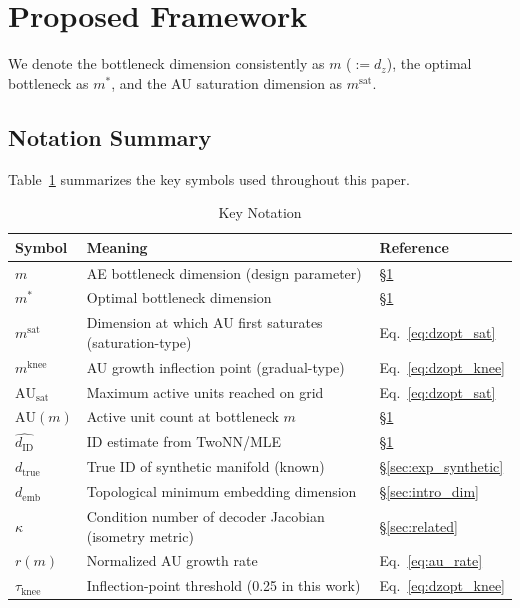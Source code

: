 \documentclass[lettersize,journal]{IEEEtran}
\newcommand{\dID}{d_{\mathrm{ID}}}
\newcommand{\dtrue}{d_{\mathrm{true}}}
\newcommand{\kap}{\kappa}
\newcommand{\AUsat}{\mathrm{AU}_{\mathrm{sat}}}
\newcommand{\demb}{d_{\mathrm{emb}}}
\begin{document}
\section{Proposed Framework}\label{sec:framework}

We denote the bottleneck dimension consistently as $m$ ($:= d_z$), the optimal bottleneck as $m^*$, and the AU saturation dimension as $m^\mathrm{sat}$.

\subsection{Notation Summary}

Table~\ref{tab:notation} summarizes the key symbols used throughout this paper.

\begin{table}[!t]
\centering
\caption{Key Notation}
\label{tab:notation}
\small
\begin{tabular}{l p{8cm} l}
\toprule
Symbol & Meaning & Reference \\
\midrule
$m$ & AE bottleneck dimension (design parameter) & \S\ref{sec:framework} \\
$m^*$ & Optimal bottleneck dimension & \S\ref{sec:framework} \\
$m^\mathrm{sat}$ & Dimension at which AU first saturates (saturation-type) & Eq.~\eqref{eq:dzopt_sat} \\
$m^\mathrm{knee}$ & AU growth inflection point (gradual-type) & Eq.~\eqref{eq:dzopt_knee} \\
$\AUsat$ & Maximum active units reached on grid & Eq.~\eqref{eq:dzopt_sat} \\
$\mathrm{AU}(m)$ & Active unit count at bottleneck $m$ & \S\ref{sec:framework} \\
$\hat{\dID}$ & ID estimate from TwoNN/MLE & \S\ref{sec:framework} \\
$\dtrue$ & True ID of synthetic manifold (known) & \S\ref{sec:exp_synthetic} \\
$\demb$ & Topological minimum embedding dimension & \S\ref{sec:intro_dim} \\
$\kap$ & Condition number of decoder Jacobian (isometry metric) & \S\ref{sec:related} \\
$r(m)$ & Normalized AU growth rate & Eq.~\eqref{eq:au_rate} \\
$\tau_\mathrm{knee}$ & Inflection-point threshold (0.25 in this work) & Eq.~\eqref{eq:dzopt_knee} \\
\bottomrule
\end{tabular}
\end{table}
\end{document}
